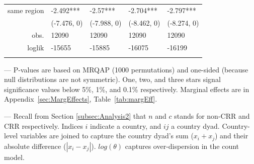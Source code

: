 \begin{table}[ht]
\begin{threeparttable}
\begin{small}
\begin{tabular}{rllll}
  same region & -2.492*** & -2.57*** & -2.704*** & -2.797*** \\ 
   & (-7.476, 0) & (-7.988, 0) & (-8.462, 0) & (-8.274, 0) \\ 
\noalign{\smallskip}\hline\noalign{\smallskip}
  obs. & 12090 & 12090 & 12090 & 12090 \\ 
  loglik & -15655 & -15885 & -16075 & -16199 \\ 
\noalign{\smallskip}\hline\noalign{\smallskip}
\end{tabular}
   \end{small}
       \begin{tablenotes}
  \footnotesize
  \item --- P-values are based on MRQAP (1000 permutations) and one-sided (because null distributions are not symmetric). One, two, and three stars signal significance values below 5\%, 1\%, and 0.1\% respectively. Marginal effects are in Appendix~\ref{sec:MargEffects}, Table~\ref{tab:margEff}.
  \item --- Recall from Section \ref{subsec:Analysis2} that $n$ and $c$ stands for non-CRR and CRR respectively. Indices $i$ indicate a country, and $ij$ a country dyad. Country-level variables are joined to capture the country dyad's sum ($x_i + x_j$) and their absolute difference ($|x_i - x_j|$).  $log(\theta)$ captures over-dispersion in the count model.
    \end{tablenotes}
\end{threeparttable}
\end{table}



\clearpage






